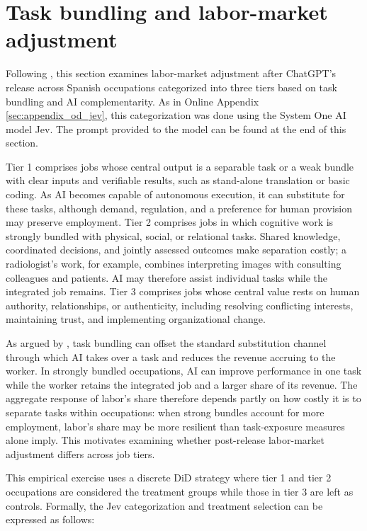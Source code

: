\clearpage
\section{Task bundling and labor-market adjustment}
\label{sec:v1_job_tiers}
Following \citet{garicano2026messy}, this section examines labor-market adjustment after ChatGPT's release across Spanish occupations categorized into three tiers based on task bundling and AI complementarity. As in Online Appendix \ref{sec:appendix_od_jev}, this categorization was done using the System One AI model Jev. The prompt provided to the model can be found at the end of this section.

Tier 1 comprises jobs whose central output is a separable task or a weak bundle with clear inputs and verifiable results, such as stand-alone translation or basic coding. As AI becomes capable of autonomous execution, it can substitute for these tasks, although demand, regulation, and a preference for human provision may preserve employment. Tier 2 comprises jobs in which cognitive work is strongly bundled with physical, social, or relational tasks. Shared knowledge, coordinated decisions, and jointly assessed outcomes make separation costly; a radiologist's work, for example, combines interpreting images with consulting colleagues and patients. AI may therefore assist individual tasks while the integrated job remains. Tier 3 comprises jobs whose central value rests on human authority, relationships, or authenticity, including resolving conflicting interests, maintaining trust, and implementing organizational change.

As argued by \citet{garicano2026weak}, task bundling can offset the standard substitution channel through which AI takes over a task and reduces the revenue accruing to the worker. In strongly bundled occupations, AI can improve performance in one task while the worker retains the integrated job and a larger share of its revenue. The aggregate response of labor's share therefore depends partly on how costly it is to separate tasks within occupations: when strong bundles account for more employment, labor's share may be more resilient than task-exposure measures alone imply. This motivates examining whether post-release labor-market adjustment differs across job tiers.

This empirical exercise uses a discrete DiD strategy where tier 1 and tier 2 occupations are considered the treatment groups while those in tier 3 are left as controls. Formally, the Jev categorization and treatment selection can be expressed as follows:


